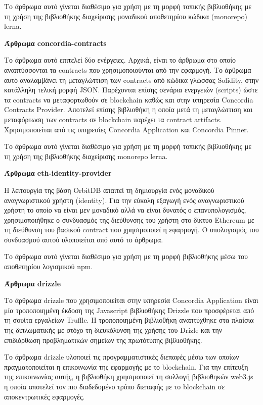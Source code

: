 Το άρθρωμα αυτό γίνεται διαθέσιμο για χρήση με τη μορφή τοπικής βιβλιοθήκης με τη χρήση της βιβλιοθήκης διαχείρισης μοναδικού αποθετηρίου κώδικα (monorepo) lerna.

\vspace{0.5cm}
\textbf{Άρθρωμα concordia-contracts}

Το άρθρωμα αυτό επιτελεί δύο ενέργειες. Αρχικά, είναι το άρθρωμα στο οποίο αναπτύσσονται τα contracts που χρησιμοποιούνται από την εφαρμογή. Το άρθρωμα αυτό αναλαμβάνει τη μεταγλώττιση των contracts από κώδικα γλώσσας Solidity, στην κατάλληλη τελική μορφή JSON. Παρέχονται επίσης σενάρια ενεργειών (scripts) ώστε τα contracts να μεταφορτωθούν σε blockchain καθώς και στην υπηρεσία Concordia Contracts Provider. Αποτελεί επίσης βιβλιοθήκη η οποία μετά τη μεταγλώττιση και μεταφόρτωση των contracts σε blockchain παρέχει τα contract artifacts. Χρησιμοποιείται από τις υπηρεσίες Concordia Application και Concordia Pinner.

Το άρθρωμα αυτό γίνεται διαθέσιμο για χρήση με τη μορφή τοπικής βιβλιοθήκης με τη χρήση της βιβλιοθήκης διαχείρισης monorepo lerna.

\vspace{0.5cm}
\textbf{Άρθρωμα eth-identity-provider}

Η λειτουργία της βάση OrbitDB απαιτεί τη δημιουργία ενός μοναδικού αναγνωριστικού χρήστη (identity). Για την εύκολη εξαγωγή ενός αναγνωριστικού χρήστη το οποίο να είναι μεν μοναδικό αλλά να είναι δυνατός ο επανυπολογισμός, χρησιμοποιήθηκε ο συνδυασμός της διεύθυνσης του χρήστη στο δίκτυο Ethereum με τη διεύθυνση του βασικού contract που χρησιμοποιεί η εφαρμογή. Ο υπολογισμός του συνδυασμού αυτού υλοποιείται από αυτό το άρθρωμα.

Το άρθρωμα αυτό γίνεται διαθέσιμο για χρήση με τη μορφή βιβλιοθήκης μέσω του αποθετηρίου λογισμικού npm.

\vspace{0.5cm}
\textbf{Άρθρωμα drizzle}

Το άρθρωμα drizzle που χρησιμοποιείται στην υπηρεσία Concordia Application είναι μία τροποποιημένη έκδοση της Javascript βιβλιοθήκης Drizzle που προσφέρεται από τη σουίτα εργαλείων Truffle. Η τροποποιημένη βιβλιοθήκη αναπτύχθηκε στα πλαίσια της διπλωματικής με στόχο τη διευκόλυνση της χρήσης του Drizle και την επιδιόρθωση προβληματικών σημείων της πρωτότυπης βιβλιοθήκης.

Το άρθρωμα drizzle υλοποιεί τις προγραμματιστικές διεπαφές μέσω των οποίων πραγματοποιείται η επικοινωνία της εφαρμογής με το blockchain. Για την επίτευξη της επικοινωνίας αυτής, η βιβλιοθήκη χρησιμοποιεί τη συλλογή βιβλιοθηκών web3.js η οποία αποτελεί τον πιο διαδεδομένο τρόπο διεπαφής με το blockchain σε αποκεντρωτικές εφαρμογές.

